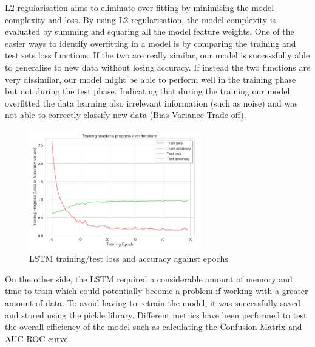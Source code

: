 L2 regularisation aims to eliminate over-fitting by minimising the model complexity and loss. By using L2 regularisation, the model complexity is evaluated by summing and squaring all the model feature weights. One of the easier ways to identify overfitting in a model is by comparing the training and test sets loss functions. If the two are really similar, our model is successfully able to generalise to new data without losing accuracy. If instead the two functions are very dissimilar, our model might be able to perform well in the training phase but not during the test phase. Indicating that during the training our model overfitted the data learning also irrelevant information (such as noise) and was not able to correctly classify new data (Bias-Variance Trade-off). 


\begin{figure}[ht!]%
    \centering
    \includegraphics[width=7.5cm]{images/LSTMplot.PNG}%
    \caption{LSTM training/test loss and accuracy against epochs}
\end{figure}

On the other side, the LSTM required a considerable amount of memory and time to train which could potentially become a problem if working with a greater amount of data. To avoid having to retrain the model, it was successfully saved and stored using the pickle library. Different metrics have been performed to test the overall efficiency of the model such as calculating the Confusion Matrix and AUC-ROC curve.


